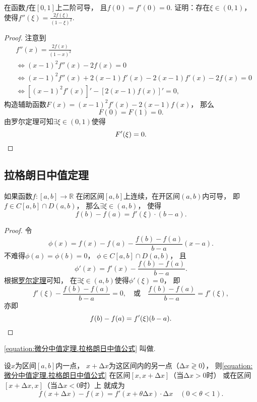 \begin{example}
在函数\(f\)在\([0,1]\)上二阶可导，
且\(f(0) = f'(0) = 0\).
证明：存在\(\xi\in(0,1)\)，
使得\(f''(\xi) = \frac{2 f(\xi)}{(1-\xi)^2}\).
\begin{proof}
注意到\begin{align*}
	&f''(x) = \frac{2 f(x)}{(1-x)^2} \\
	&\iff
	(x-1)^2 f''(x) - 2 f(x) = 0 \\
	&\iff
	(x-1)^2 f''(x) + 2 (x-1) f'(x) - 2 (x-1) f'(x) - 2 f(x) = 0 \\
	&\iff
	[(x-1)^2 f'(x)]' - [2 (x-1) f(x)]' = 0,
\end{align*}
构造辅助函数\(F(x) = (x-1)^2 f'(x) - 2 (x-1) f(x)\)，
那么\[
	F(0) = F(1) = 0.
\]
由罗尔定理可知\(\exists\xi\in(0,1)\)使得\[
	F'(\xi) = 0.
	\qedhere
\]
\end{proof}
\end{example}

\subsection{拉格朗日中值定理}
\begin{theorem}[拉格朗日中值定理]\label{theorem:微分中值定理.拉格朗日中值定理}
如果函数\(f\colon[a,b]\to\mathbb{R}\)
在闭区间\([a,b]\)上连续，在开区间\((a,b)\)内可导，
即\(f \in C[a,b] \cap D(a,b)\)，
那么\(\exists \xi \in (a,b)\)，
使得\begin{equation}\label{equation:微分中值定理.拉格朗日中值公式}
	f(b) - f(a) = f'(\xi) \cdot (b-a).
\end{equation}
\begin{proof}
令\[
	\phi(x)=f(x)-f(a)-\frac{f(b)-f(a)}{b-a}(x-a).
\]
不难得\(\phi(a)=\phi(b)=0\)，
\(\phi\in C[a,b]\cap D(a,b)\)，
且\[
	\phi'(x)=f'(x)-\frac{f(b)-f(a)}{b-a}.
\]
根据\hyperref[theorem:微分中值定理.罗尔定理]{罗尔定理}可知，
在\(\exists\xi\in(a,b)\)使得\(\phi'(\xi)=0\)，
即\[
	f'(\xi)-\frac{f(b)-f(a)}{b-a}=0,
	\quad\text{或}\quad
	\frac{f(b)-f(a)}{b-a}=f'(\xi),
\]
亦即\[
	f(b)-f(a)=f'(\xi)(b-a).
	\qedhere
\]
\end{proof}
\end{theorem}
\cref{equation:微分中值定理.拉格朗日中值公式} 叫做.

设\(x\)为区间\([a,b]\)内一点，
\(x+\increment x\)为这区间内的另一点（\(\increment x \gtrless 0\)），
则\cref{equation:微分中值定理.拉格朗日中值公式}
在区间\([x,x+\increment x]\)（当\(\increment x>0\)时）
或在区间\([x+\increment x,x]\)（当\(\increment x<0\)时）上
就成为\begin{equation}
	f(x+\increment x) - f(x)
	= f'(x+\theta \increment x) \cdot \increment x
	\quad(0<\theta<1).
\end{equation}

